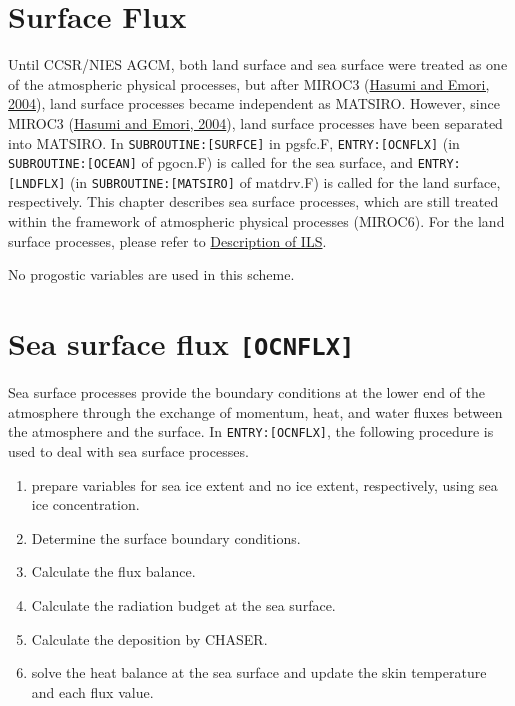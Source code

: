 \hypertarget{surface-flux}{%
\section{Surface Flux}\label{surface-flux}}

Until CCSR/NIES AGCM, both land surface and sea surface were treated as
one of the atmospheric physical processes, but after MIROC3
(\href{https://ccsr.aori.u-tokyo.ac.jp/~hasumi/miroc_description.pdf}{Hasumi
and Emori, 2004}), land surface processes became independent as MATSIRO.
However, since MIROC3
(\href{https://ccsr.aori.u-tokyo.ac.jp/~hasumi/miroc_description.pdf}{Hasumi
and Emori, 2004}), land surface processes have been separated into
MATSIRO. In \texttt{SUBROUTINE:{[}SURFCE{]}} in pgsfc.F,
\texttt{ENTRY:{[}OCNFLX{]}} (in \texttt{SUBROUTINE:{[}OCEAN{]}} of
pgocn.F) is called for the sea surface, and \texttt{ENTRY:{[}LNDFLX{]}}
(in \texttt{SUBROUTINE:{[}MATSIRO{]}} of matdrv.F) is called for the
land surface, respectively. This chapter describes sea surface
processes, which are still treated within the framework of atmospheric
physical processes (MIROC6). For the land surface processes, please
refer to
\href{https://github.com/integrated-land-simulator/model_description}{Description
of ILS}.

No progostic variables are used in this scheme.

\hypertarget{sea-surface-flux-ocnflx}{%
\section{\texorpdfstring{Sea surface flux
\texttt{{[}OCNFLX{]}}}{Sea surface flux {[}OCNFLX{]}}}\label{sea-surface-flux-ocnflx}}

Sea surface processes provide the boundary conditions at the lower end
of the atmosphere through the exchange of momentum, heat, and water
fluxes between the atmosphere and the surface. In
\texttt{ENTRY:{[}OCNFLX{]}}, the following procedure is used to deal
with sea surface processes.

\begin{enumerate}
\def\labelenumi{\arabic{enumi}.}
\tightlist
\item
  prepare variables for sea ice extent and no ice extent, respectively,
  using sea ice concentration.
\item
  Determine the surface boundary conditions.
\item
  Calculate the flux balance.
\item
  Calculate the radiation budget at the sea surface.
\item
  Calculate the deposition by CHASER.
\item
  solve the heat balance at the sea surface and update the skin
  temperature and each flux value.
\end{enumerate}

